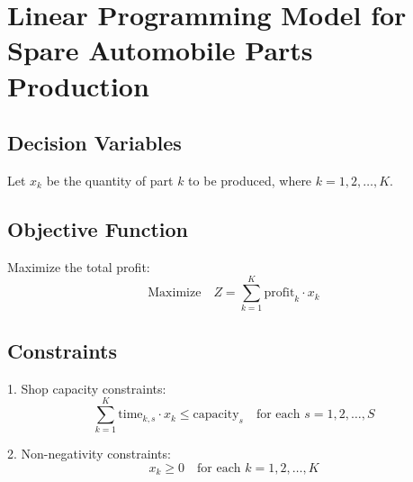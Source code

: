 \documentclass{article}
\begin{document}
\section*{Linear Programming Model for Spare Automobile Parts Production}

\subsection*{Decision Variables}
Let \( x_k \) be the quantity of part \( k \) to be produced, where \( k = 1, 2, \ldots, K \).

\subsection*{Objective Function}
Maximize the total profit:
\[
\text{Maximize} \quad Z = \sum_{k=1}^{K} \text{profit}_k \cdot x_k
\]

\subsection*{Constraints}
1. Shop capacity constraints:
\[
\sum_{k=1}^{K} \text{time}_{k, s} \cdot x_k \leq \text{capacity}_s \quad \text{for each } s = 1, 2, \ldots, S
\]

2. Non-negativity constraints:
\[
x_k \geq 0 \quad \text{for each } k = 1, 2, \ldots, K
\]
\end{document}
